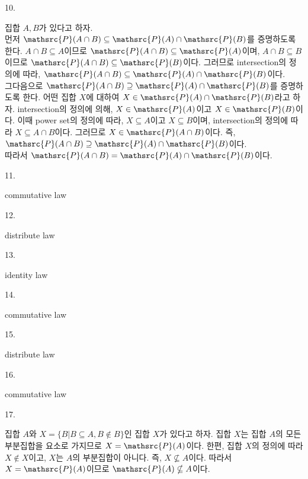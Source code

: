 \documentclass{article}
\begin{document}
10.
\begin{addmargin}[1em]{2em}
집합 $A,B$가 있다고 하자.\\
먼저 $\mathsrc{P}(A\cap B)\subseteq \mathsrc{P}(A)\cap \mathsrc{P}(B)$를 증명하도록 한다. $A\cap B \subseteq A$이므로 $\mathsrc{P}(A\cap B)\subseteq \mathsrc{P}(A)$이며, $A\cap B \subseteq B$이므로 $\mathsrc{P}(A\cap B)\subseteq \mathsrc{P}(B)$이다. 그러므로 intersection의 정의에 따라,  $\mathsrc{P}(A\cap B)\subseteq \mathsrc{P}(A)\cap \mathsrc{P}(B)$이다. \\
그다음으로 $\mathsrc{P}(A\cap B)\supseteq \mathsrc{P}(A)\cap \mathsrc{P}(B)$를 증명하도록 한다. 어떤 집합 $X$에 대하여 $X \in \mathsrc{P}(A)\cap \mathsrc{P}(B)$라고 하자. intersection의 정의에 의해, $X\in \mathsrc{P}(A)$이고 $X\in \mathsrc{P}(B)$이다.  이때 power set의 정의에 따라, $X\subseteq A$이고 $X\subseteq B$이며, intersection의 정의에 따라 $X\subseteq A\cap B$이다. 그러므로 $X\in \mathsrc{P}(A\cap B)$이다. 즉,  $\mathsrc{P}(A\cap B)\supseteq \mathsrc{P}(A)\cap \mathsrc{P}(B)$이다.\\
따라서 $\mathsrc{P}(A\cap B)=\mathsrc{P}(A)\cap \mathsrc{P}(B)$이다.
\end{addmargin}
\bigskip

11.
\begin{addmargin}[1em]{2em}
commutative law
\end{addmargin}
\bigskip

12.
\begin{addmargin}[1em]{2em}
distribute law
\end{addmargin}
\bigskip

13.
\begin{addmargin}[1em]{2em}
identity law
\end{addmargin}
\bigskip

14.
\begin{addmargin}[1em]{2em}
commutative law
\end{addmargin}
\bigskip

15.
\begin{addmargin}[1em]{2em}
distribute law
\end{addmargin}
\bigskip

16.
\begin{addmargin}[1em]{2em}
commutative law
\end{addmargin}
\bigskip

17.
\begin{addmargin}[1em]{2em}
집합 $A$와 $X=\{B|B\subseteq A,B\notin B\}$인 집합 $X$가 있다고 하자. 집합 $X$는 집합 $A$의 모든 부분집합을 요소로 가지므로 $X=\mathsrc{P}(A)$이다. 한편, 집합 $X$의 정의에 따라 $X\notin X$이고, $X$는 $A$의 부분집합이 아니다. 즉, $X\nsubseteq A$이다. 따라서 $X=\mathsrc{P}(A)$이므로 $\mathsrc{P}(A)\nsubseteq A$이다.
\end{addmargin}
\bigskip
\end{document}

